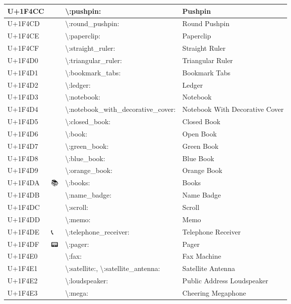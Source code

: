\begin{table}[h]
\begin{tabulary}{\linewidth}{|L|L|L|L|}
\hline
U+1F4CC & 📌 & {\textbackslash}:pushpin: & Pushpin \\
\hline
U+1F4CD & 📍 & {\textbackslash}:round\_pushpin: & Round Pushpin \\
\hline
U+1F4CE & 📎 & {\textbackslash}:paperclip: & Paperclip \\
\hline
U+1F4CF & 📏 & {\textbackslash}:straight\_ruler: & Straight Ruler \\
\hline
U+1F4D0 & 📐 & {\textbackslash}:triangular\_ruler: & Triangular Ruler \\
\hline
U+1F4D1 & 📑 & {\textbackslash}:bookmark\_tabs: & Bookmark Tabs \\
\hline
U+1F4D2 & 📒 & {\textbackslash}:ledger: & Ledger \\
\hline
U+1F4D3 & 📓 & {\textbackslash}:notebook: & Notebook \\
\hline
U+1F4D4 & 📔 & {\textbackslash}:notebook\_with\_decorative\_cover: & Notebook With Decorative Cover \\
\hline
U+1F4D5 & 📕 & {\textbackslash}:closed\_book: & Closed Book \\
\hline
U+1F4D6 & 📖 & {\textbackslash}:book: & Open Book \\
\hline
U+1F4D7 & 📗 & {\textbackslash}:green\_book: & Green Book \\
\hline
U+1F4D8 & 📘 & {\textbackslash}:blue\_book: & Blue Book \\
\hline
U+1F4D9 & 📙 & {\textbackslash}:orange\_book: & Orange Book \\
\hline
U+1F4DA & 📚 & {\textbackslash}:books: & Books \\
\hline
U+1F4DB & 📛 & {\textbackslash}:name\_badge: & Name Badge \\
\hline
U+1F4DC & 📜 & {\textbackslash}:scroll: & Scroll \\
\hline
U+1F4DD & 📝 & {\textbackslash}:memo: & Memo \\
\hline
U+1F4DE & 📞 & {\textbackslash}:telephone\_receiver: & Telephone Receiver \\
\hline
U+1F4DF & 📟 & {\textbackslash}:pager: & Pager \\
\hline
U+1F4E0 & 📠 & {\textbackslash}:fax: & Fax Machine \\
\hline
U+1F4E1 & 📡 & {\textbackslash}:satellite:, {\textbackslash}:satellite\_antenna: & Satellite Antenna \\
\hline
U+1F4E2 & 📢 & {\textbackslash}:loudspeaker: & Public Address Loudspeaker \\
\hline
U+1F4E3 & 📣 & {\textbackslash}:mega: & Cheering Megaphone \\

\end{tabulary}
\end{table}
